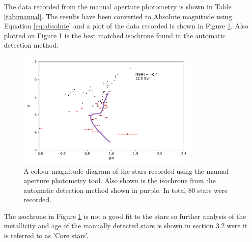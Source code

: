 \documentclass[11pt]{article}
\begin{document}
The data recorded from the manual aperture photometry is shown in Table \ref{tab:manual}. The results have been converted to Absolute magnitude using Equation \ref{eq:absolute} and a plot of the data recorded is shown in Figure \ref{fig:man}. Also plotted on Figure \ref{fig:man} is the best matched isochrone found in the automatic detection method.

\begin{figure}[h]
	\centering
	\includegraphics[width=0.8\textwidth]{../Figures/manual}
	\caption{A colour magnitude diagram of the stars recorded using the manual aperture photometry tool. Also shown is the isochrone from the automatic detection method shown in purple. In total 80 stars were recorded. }
	\label{fig:man}
\end{figure}

The isochrone in Figure \ref{fig:man} is not a good fit to the stars so further analysis of the metallicity and age of the manually detected stars is shown in section 3.2 were it is referred to as 'Core stars'.

\end{document}
